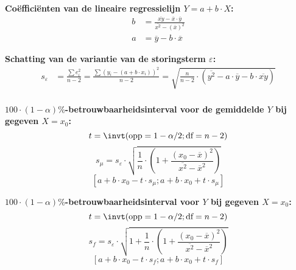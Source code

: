 \textbf{Co\"effici\"enten van de lineaire regressielijn $Y = a + b\cdot X$:}
\begin{align*}
    b &= \frac{\overline{xy} - \overline{x} \cdot \overline{y}}{\overline{x^2} - (\overline{x})^2} \\
    a &= \overline{y} - b \cdot \overline{x}
\end{align*}

\textbf{Schatting van de variantie van de storingsterm $\varepsilon$:}
\begin{align*}
    s_{\varepsilon} &= \frac{\sum e_i^2}{n - 2} = \frac{\sum \left(y_i - (a + b \cdot x_i)\right)^2}{n - 2}=  \sqrt{ \frac{n}{n-2} \cdot \left( \overline{y^2} - a \cdot \overline{y} - b \cdot \overline{xy} \right) } \\ 
\end{align*}

\textbf{\boldmath$100\cdot(1-\alpha)\%$-betrouwbaarheidsinterval voor de gemiddelde $Y$ bij gegeven $X = x_0$:}
\[
    t = \invt(\text{opp} = 1 - \alpha/2; \text{df} = n - 2)
\]
\[
    s_\mu = s_{\varepsilon} \cdot \sqrt{ \frac{1}{n} \cdot \left( 1 + \frac{(x_0 - \overline{x})^2}{\overline{x^2} - \overline{x}^2} \right) }
\]
\[
    [a+b\cdot x_0 - t \cdot s_\mu; a+b\cdot x_0 + t \cdot s_\mu]
\]

\textbf{\boldmath$100\cdot(1-\alpha)\%$-betrouwbaarheidsinterval voor $Y$ bij gegeven $X = x_0$:}
\[
    t = \invt(\text{opp} = 1 - \alpha/2; \text{df} = n - 2)
\]
\[
    s_f = s_{\varepsilon} \cdot \sqrt{ 1 + \frac{1}{n} \cdot \left( 1 + \frac{(x_0 - \overline{x})^2}{\overline{x^2} - \overline{x}^2} \right) }
\]
\[
    [a+b\cdot x_0 - t \cdot s_f; a+b\cdot x_0 + t \cdot s_f]
\]






